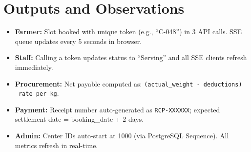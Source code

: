 \section{Outputs and Observations}
\begin{itemize}
  \item \textbf{Farmer:} Slot booked with unique token (e.g., ``C-048'') in 3 API calls. SSE queue updates every 5 seconds in browser.
  \item \textbf{Staff:} Calling a token updates status to ``Serving'' and all SSE clients refresh immediately.
  \item \textbf{Procurement:} Net payable computed as: \texttt{(actual\_weight - deductions) \texttimes\ rate\_per\_kg}.
  \item \textbf{Payment:} Receipt number auto-generated as \texttt{RCP-XXXXXX}; expected settlement date = booking\_date + 2 days.
  \item \textbf{Admin:} Center IDs auto-start at 1000 (via PostgreSQL Sequence). All metrics refresh in real-time.
\end{itemize}
